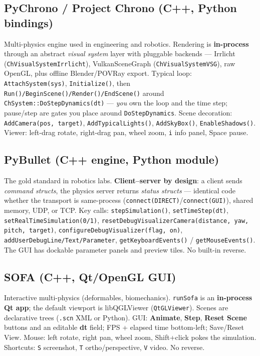 \documentclass[11pt]{article}
\newcommand{\code}[1]{\texttt{#1}}
\begin{document}
\subsection{PyChrono / Project Chrono (C++, Python bindings)}

Multi-physics engine used in engineering and robotics. Rendering is
\textbf{in-process} through an abstract \emph{visual system} layer
with pluggable backends --- Irrlicht
(\code{ChVisualSystemIrrlicht}), VulkanSceneGraph
(\code{ChVisualSystemVSG}), raw OpenGL, plus offline Blender/POVRay
export. Typical loop: \code{AttachSystem(sys)}, \code{Initialize()},
then \code{Run()/BeginScene()/Render()/EndScene()} around
\code{ChSystem::DoStepDynamics(dt)} --- \emph{you} own the loop and
the time step; pause/step are gates you place around
\code{DoStepDynamics}. Scene decoration: \code{AddCamera(pos,
target)}, \code{AddTypicalLights()}, \code{AddSkyBox()},
\code{EnableShadows()}. Viewer: left-drag rotate, right-drag pan,
wheel zoom, \code{i} info panel, Space pause.

\subsection{PyBullet (C++ engine, Python module)}

The gold standard in robotics labs. \textbf{Client--server by
design}: a client sends \emph{command structs}, the physics server
returns \emph{status structs} --- identical code whether the transport
is same-process (\code{connect(DIRECT)}/\code{connect(GUI)}), shared
memory, UDP, or TCP. Key calls: \code{stepSimulation()},
\code{setTimeStep(dt)}, \code{setRealTimeSimulation(0/1)},
\code{resetDebugVisualizerCamera(distance, yaw, pitch, target)},
\code{configureDebugVisualizer(flag, on)},
\code{addUserDebugLine/Text/Parameter},
\code{getKeyboardEvents()} / \code{getMouseEvents()}. The GUI has
dockable parameter panels and preview tiles. No built-in reverse.

\subsection{SOFA (C++, Qt/OpenGL GUI)}

Interactive multi-physics (deformables, biomechanics). \code{runSofa}
is an \textbf{in-process Qt app}; the default viewport is
libQGLViewer (\code{QtGLViewer}). Scenes are declarative trees
(\code{.scn} XML or Python). GUI: \textbf{Animate}, \textbf{Step},
\textbf{Reset Scene} buttons and an editable \textbf{dt} field; FPS +
elapsed time bottom-left; Save/Reset View. Mouse: left rotate, right
pan, wheel zoom, Shift+click pokes the simulation. Shortcuts:
\code{S} screenshot, \code{T} ortho/perspective, \code{V} video. No
reverse.
\end{document}
